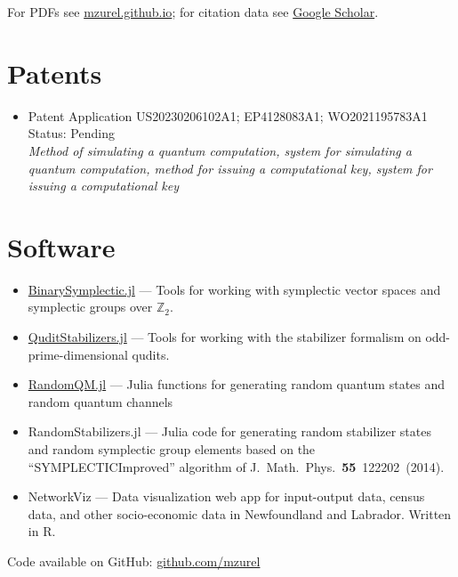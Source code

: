 \documentclass[letterpaper,11pt]{article}
\newcommand{\ConferenceItem}[3]{
	\item{\parbox{0.97\textwidth}{
		{#1}  \hfill {#2}\\
		\emph{#3}
	}}
}
\begin{document}
\nocite{ZurelRaussendorf2024,ZurelHeimendahl2024b,ZurelHeimendahl2024a,ZurelCohenRaussendorf2023,RaussendorfFeldmann2023,OkayRaussendorf2021,ZurelRaussendorf2020,RaussendorfZurel2020}
\printbibliography[title={Publications \& preprints}]
For PDFs see \href{mzurel.github.io}{mzurel.github.io}; for citation data see \href{https://scholar.google.com/citations?user=qUA_szUAAAAJ&hl=en&oi=ao}{Google Scholar}.


\section*{Patents}
\begin{itemize}[leftmargin=*]
	\ConferenceItem{Patent Application US20230206102A1; EP4128083A1; WO2021195783A1}{Status: Pending}{Method of simulating a quantum computation, system for simulating a quantum computation, method for issuing a computational key, system for issuing a computational key}
\end{itemize}


\section*{Software}
\begin{itemize}[leftmargin=*]
	\item \href{https://github.com/mzurel/BinarySymplectic.jl}{BinarySymplectic.jl} --- Tools for working with symplectic vector spaces and symplectic groups over $\mathbb{Z}_2$.
	\vspace{-4pt}
	\item \href{https://github.com/mzurel/QuditStabilizers.jl}{QuditStabilizers.jl} --- Tools for working with the stabilizer formalism on odd-prime-dimensional qudits.
	\vspace{-4pt}
	\item \href{https://github.com/mzurel/RandomQM.jl}{RandomQM.jl} --- Julia functions for generating random quantum states and random quantum channels
	\vspace{-4pt}
	\item %
	RandomStabilizers.jl --- Julia code for generating random stabilizer states and random symplectic group elements based on the ``SYMPLECTICImproved'' algorithm of J.~Math.~Phys.~\textbf{55}~122202~(2014).
	\vspace{-4pt}
	\item NetworkViz --- Data visualization web app for input-output data, census data, and other socio-economic data in Newfoundland and Labrador.  Written in R.
	\vspace{-4pt}
\end{itemize}
Code available on GitHub: \href{https://github.com/mzurel}{github.com/mzurel}
\end{document}
